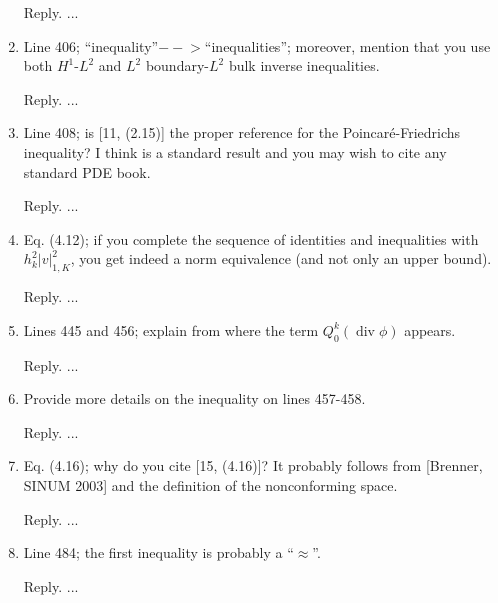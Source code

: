 \documentclass[10pt]{amsart}
\theoremstyle{definition}
\theoremstyle{remark}
\renewcommand{\div}{\operatorname{div}}
\begin{document}
\begin{enumerate}[1.]
\smallskip \noindent \textcolor[rgb]{1.00,0.00,0.00}{Reply.}
...

\medskip

\item \textsf{Line 406; “inequality”$-\!\!\!-\!\!\!>$“inequalities”; moreover, mention that you use both $H^1$-$L^2$ and $L^2$ boundary-$L^2$ bulk inverse inequalities.}

\smallskip \noindent \textcolor[rgb]{1.00,0.00,0.00}{Reply.}
...

\medskip

\item \textsf{Line 408; is [11, (2.15)] the proper reference for the Poincar\'e-Friedrichs inequality? I think is a standard result and you may wish to cite any standard PDE book.}

\smallskip \noindent \textcolor[rgb]{1.00,0.00,0.00}{Reply.}
...

\medskip

\item \textsf{Eq. (4.12); if you complete the sequence of identities and inequalities with $h_k^2|v|_{1,K}^2$, you get indeed a norm equivalence (and not only an upper bound).}

\smallskip \noindent \textcolor[rgb]{1.00,0.00,0.00}{Reply.}
...

\medskip

\item \textsf{Lines 445 and 456; explain from where the term $Q_0^k(\div\phi)$ appears.}

\smallskip \noindent \textcolor[rgb]{1.00,0.00,0.00}{Reply.}
...

\medskip

\item \textsf{Provide more details on the inequality on lines 457-458.}

\smallskip \noindent \textcolor[rgb]{1.00,0.00,0.00}{Reply.}
...

\medskip

\item \textsf{Eq. (4.16); why do you cite [15, (4.16)]? It probably follows from [Brenner, SINUM 2003] and the definition of the nonconforming space.}

\smallskip \noindent \textcolor[rgb]{1.00,0.00,0.00}{Reply.}
...

\medskip

\item \textsf{Line 484; the first inequality is probably a “$\approx$”.}

\smallskip \noindent \textcolor[rgb]{1.00,0.00,0.00}{Reply.}
...


\end{enumerate}
\end{document}
